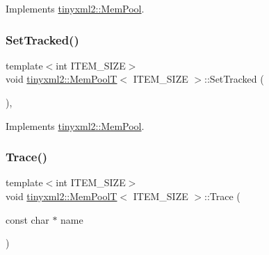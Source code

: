 Implements \mbox{\hyperlink{classtinyxml2_1_1_mem_pool_a0c518d49e3a94bde566f61e13b7240bb}{tinyxml2\+::\+Mem\+Pool}}.

\mbox{\label{classtinyxml2_1_1_mem_pool_t_aee3c611215ae08cce41a940bf2763027}} 
\subsubsection{\texorpdfstring{Set\+Tracked()}{SetTracked()}}
{\footnotesize\ttfamily template$<$int I\+T\+E\+M\+\_\+\+S\+I\+ZE$>$ \\
void \mbox{\hyperlink{classtinyxml2_1_1_mem_pool_t}{tinyxml2\+::\+Mem\+PoolT}}$<$ I\+T\+E\+M\+\_\+\+S\+I\+ZE $>$\+::Set\+Tracked (\begin{DoxyParamCaption}{ }\end{DoxyParamCaption})\hspace{0.3cm}{\ttfamily [inline]}, {\ttfamily [virtual]}}



Implements \mbox{\hyperlink{classtinyxml2_1_1_mem_pool_ac5804dd1387b2e4de5eef710076a0db1}{tinyxml2\+::\+Mem\+Pool}}.

\mbox{\label{classtinyxml2_1_1_mem_pool_t_a47eefbd934ef70d973ea41d41ab5f239}} 
\subsubsection{\texorpdfstring{Trace()}{Trace()}}
{\footnotesize\ttfamily template$<$int I\+T\+E\+M\+\_\+\+S\+I\+ZE$>$ \\
void \mbox{\hyperlink{classtinyxml2_1_1_mem_pool_t}{tinyxml2\+::\+Mem\+PoolT}}$<$ I\+T\+E\+M\+\_\+\+S\+I\+ZE $>$\+::Trace (\begin{DoxyParamCaption}\item[{const char $\ast$}]{name }\end{DoxyParamCaption})\hspace{0.3cm}{\ttfamily [inline]}}

\mbox{\label{classtinyxml2_1_1_mem_pool_t_a3bcdc302ae15d2810e11192321a8f5f1}} 
